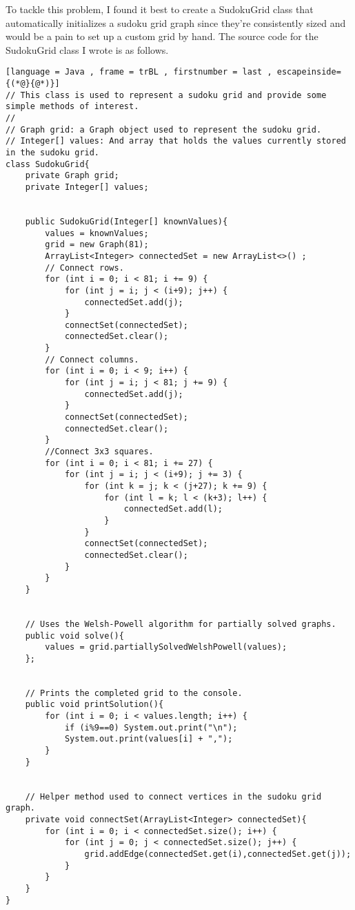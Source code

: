 \documentclass[12pt, letterpaper]{article}
\begin{document}
\begin{figure}[H]%
\begin{center}
\end{center}
\end{figure}


To tackle this problem, I found it best to create a SudokuGrid class that automatically initializes a sudoku grid graph since they're consistently sized and would be a pain to set up a custom grid by hand. The source code for the SudokuGrid class I wrote is as follows.


\begin{lstlisting}[language = Java , frame = trBL , firstnumber = last , escapeinside={(*@}{@*)}]
// This class is used to represent a sudoku grid and provide some simple methods of interest.
//
// Graph grid: a Graph object used to represent the sudoku grid.
// Integer[] values: And array that holds the values currently stored in the sudoku grid.
class SudokuGrid{
    private Graph grid;
    private Integer[] values;


    public SudokuGrid(Integer[] knownValues){
        values = knownValues;
        grid = new Graph(81);
        ArrayList<Integer> connectedSet = new ArrayList<>() ;
        // Connect rows.
        for (int i = 0; i < 81; i += 9) {
            for (int j = i; j < (i+9); j++) {
                connectedSet.add(j);
            }
            connectSet(connectedSet);
            connectedSet.clear();
        }
        // Connect columns.
        for (int i = 0; i < 9; i++) {
            for (int j = i; j < 81; j += 9) {
                connectedSet.add(j);
            }
            connectSet(connectedSet);
            connectedSet.clear();
        }
        //Connect 3x3 squares.
        for (int i = 0; i < 81; i += 27) {
            for (int j = i; j < (i+9); j += 3) {
                for (int k = j; k < (j+27); k += 9) {
                    for (int l = k; l < (k+3); l++) {
                        connectedSet.add(l);
                    }
                }
                connectSet(connectedSet);
                connectedSet.clear();
            }
        }
    }


    // Uses the Welsh-Powell algorithm for partially solved graphs.
    public void solve(){
        values = grid.partiallySolvedWelshPowell(values);
    };


    // Prints the completed grid to the console.
    public void printSolution(){
        for (int i = 0; i < values.length; i++) {
            if (i%9==0) System.out.print("\n");
            System.out.print(values[i] + ",");
        }
    }


    // Helper method used to connect vertices in the sudoku grid graph.
    private void connectSet(ArrayList<Integer> connectedSet){
        for (int i = 0; i < connectedSet.size(); i++) {
            for (int j = 0; j < connectedSet.size(); j++) {
                grid.addEdge(connectedSet.get(i),connectedSet.get(j));
            }
        }
    }
}
\end{lstlisting}
\end{document}
